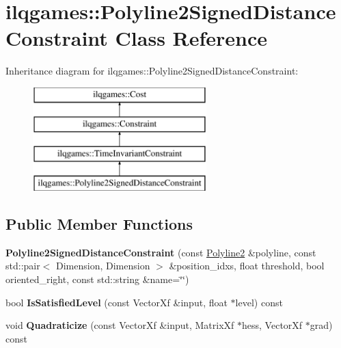 \hypertarget{classilqgames_1_1_polyline2_signed_distance_constraint}{}\section{ilqgames\+:\+:Polyline2\+Signed\+Distance\+Constraint Class Reference}
\label{classilqgames_1_1_polyline2_signed_distance_constraint}
Inheritance diagram for ilqgames\+:\+:Polyline2\+Signed\+Distance\+Constraint\+:\begin{figure}[H]
\begin{center}
\leavevmode
\includegraphics[height=4.000000cm]{classilqgames_1_1_polyline2_signed_distance_constraint}
\end{center}
\end{figure}
\subsection*{Public Member Functions}
\begin{DoxyCompactItemize}
\item 
{\bfseries Polyline2\+Signed\+Distance\+Constraint} (const \hyperlink{classilqgames_1_1_polyline2}{Polyline2} \&polyline, const std\+::pair$<$ Dimension, Dimension $>$ \&position\+\_\+idxs, float threshold, bool oriented\+\_\+right, const std\+::string \&name=\char`\"{}\char`\"{})\hypertarget{classilqgames_1_1_polyline2_signed_distance_constraint_acbcaeeb0b52b5de6fc25a03487677bc1}{}\label{classilqgames_1_1_polyline2_signed_distance_constraint_acbcaeeb0b52b5de6fc25a03487677bc1}

\item 
bool {\bfseries Is\+Satisfied\+Level} (const Vector\+Xf \&input, float $\ast$level) const \hypertarget{classilqgames_1_1_polyline2_signed_distance_constraint_ac30e6fad83247ddc86f3cb69a6e4d8cc}{}\label{classilqgames_1_1_polyline2_signed_distance_constraint_ac30e6fad83247ddc86f3cb69a6e4d8cc}

\item 
void {\bfseries Quadraticize} (const Vector\+Xf \&input, Matrix\+Xf $\ast$hess, Vector\+Xf $\ast$grad) const \hypertarget{classilqgames_1_1_polyline2_signed_distance_constraint_a0468a14f66cc448cc21a1351c393ec21}{}\label{classilqgames_1_1_polyline2_signed_distance_constraint_a0468a14f66cc448cc21a1351c393ec21}

\end{DoxyCompactItemize}
